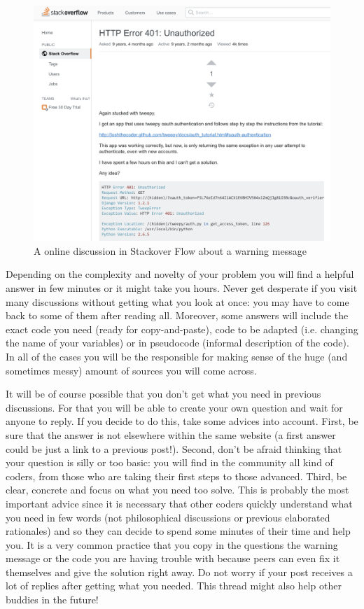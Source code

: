 \begin{figure}
\centering
\includegraphics[width=0.9\linewidth]{figures/ch4_stackover}
\caption{A online discussion in Stackover Flow about a warning message }
\label{fig:stackover}
\end{figure}

Depending on the complexity and novelty of your problem you will find a helpful answer in few minutes or it might take you hours. Never get desperate if you visit many discussions without getting what you look at once: you may have to come back to some of them after reading all. Moreover, some answers will include the exact code you need (ready for copy-and-paste), code to be adapted (i.e. changing the name of your variables) or in pseudocode (informal description of the code). In all of the cases you will be the responsible for making sense of the huge (and sometimes messy) amount of sources you will come across. 

It will be of course possible that you don't get what you need in previous discussions. For that you will be able to create your own question and wait for anyone to reply. If you decide to do this, take some advices into account. First, be sure that the answer is not elsewhere within the same website (a first answer could be just a link to a previous post!). Second, don't be afraid thinking that your question is silly or too basic: you will find in the community all kind of coders, from those who are taking their first steps to those advanced. Third, be clear, concrete and focus on what you need too solve. This is probably the most important advice since it is necessary that other coders quickly understand what you need in few words (not philosophical discussions or previous elaborated rationales) and so they can decide to spend some minutes of their time and help you. It is a very common practice that you copy in the questions the warning message or the code you are having trouble with because peers can even fix it themselves and give the solution right away. Do not worry if your post receives a lot of replies after getting what you needed. This thread might also help other buddies in the future!

